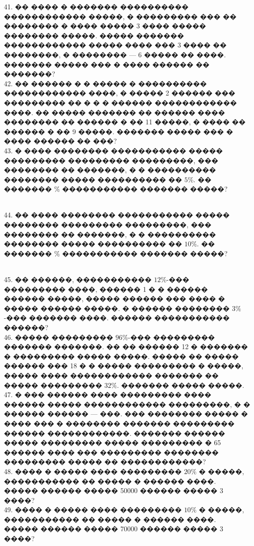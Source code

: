 \documentclass[12pt]{article}
\begin{document}
41. �� ���� � ������� ���������� ������������ �����, � ��������� ��� �� �������� � ���� ����� 3 ���� ����� �������� �����. ����� ������� ������������ ����� ���� ��� 3 ���� �� ��������, � �������� ---
6 ����� �� ����. ������� ����� ��� � ���� ������ �� �������?\\
42. �� ������ � � ����� � ���������� ������������ ����, � ����� 2 ������ ��� ��������� �� � � � ������ ������������ ����. �� ����� ������� �� ������ ���� �������� �� ������ � �� 11 �����, � ���� �� ������ � �� 9 �����. ������� ����� ��� � ���� ������ �� ���?\\
43. � ���� �������� ����������� ����� ��������� ��������� ���������, ��� �������� �� �������, � � ���������� �������� ����� ���������� �� $5\%.$ �� ������� $\%$ ����������� ������� �����?
\begin{figure}[h]
\end{figure}\\
44. �� ���� �������� ����������� ����� �������� ��������� ���������, ��� �������� �� �������, � � ���������� �������� ����� ���������� �� $10\%.$ �� ������� $\%$ ����������� ������� �����?
\begin{figure}[h]
\end{figure}\\
45. �� ������, ����������� $12\%$-��� ��������� ����, ������ 1 � � ������ ������ �����, ����� ������ ��� ���� � ����� ������ �����. � ������ �������� $3\%$-��� ������� ����. ������ ����������� ������?\\
46. ����� ��������� $96\%$-��� ��������� ������� �������. �� �� ������ 12 � ������� � ��������� ����� �����. ����� �� ����� ������ ��� 18 � � ����� ��������� � �����, ����� ���� ������������ ������� �� ����� ��������� $32\%.$ ������� ����� �����.\\
47. � ��� ������ ���� ��������� ���� ������ ����� ������������ ���������, � � ������ ������ --- ���. ��� �������� ����� � ���� ��� � �������� ������� ��������� ������ ������������. ������� ������ ����� ��������� ����� ��������� � 65 ������ ���� ��� ��������� �������� ��������� ����� �� ������������?\\
48. ���� � ����� ���� ��������� $20\%$ � �����, ����������� �� ����� � ������ ����. ����� ������ ����� 50000 ������ ����� 3 ����?\\
49. ���� � ����� ���� ��������� $10\%$ � �����, ����������� �� ����� � ������ ����. ����� ������ ����� 70000 ������ ����� 3 ����?\\
\end{document}
